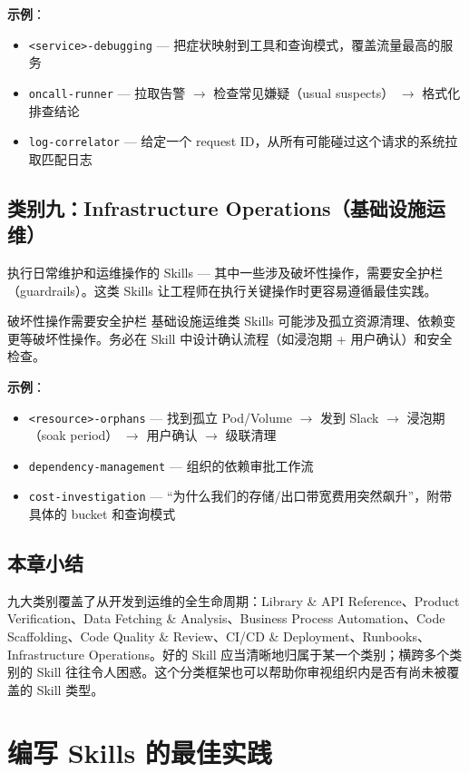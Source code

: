 \documentclass[a4paper]{article}
\begin{document}
\textbf{示例}：
\begin{itemize}
    \item \texttt{<service>-debugging} --- 把症状映射到工具和查询模式，覆盖流量最高的服务
    \item \texttt{oncall-runner} --- 拉取告警 $\to$ 检查常见嫌疑（usual suspects） $\to$ 格式化排查结论
    \item \texttt{log-correlator} --- 给定一个 request ID，从所有可能碰过这个请求的系统拉取匹配日志
\end{itemize}

\subsection{类别九：Infrastructure Operations（基础设施运维）}

执行日常维护和运维操作的 Skills --- 其中一些涉及破坏性操作，需要安全护栏（guardrails）。这类 Skills 让工程师在执行关键操作时更容易遵循最佳实践。

\begin{warningbox}{破坏性操作需要安全护栏}
基础设施运维类 Skills 可能涉及孤立资源清理、依赖变更等破坏性操作。务必在 Skill 中设计确认流程（如浸泡期 + 用户确认）和安全检查。
\end{warningbox}

\textbf{示例}：
\begin{itemize}
    \item \texttt{<resource>-orphans} --- 找到孤立 Pod/Volume $\to$ 发到 Slack $\to$ 浸泡期（soak period） $\to$ 用户确认 $\to$ 级联清理
    \item \texttt{dependency-management} --- 组织的依赖审批工作流
    \item \texttt{cost-investigation} --- ``为什么我们的存储/出口带宽费用突然飙升''，附带具体的 bucket 和查询模式
\end{itemize}

\subsection{本章小结}

九大类别覆盖了从开发到运维的全生命周期：Library \& API Reference、Product Verification、Data Fetching \& Analysis、Business Process Automation、Code Scaffolding、Code Quality \& Review、CI/CD \& Deployment、Runbooks、Infrastructure Operations。好的 Skill 应当清晰地归属于某一个类别；横跨多个类别的 Skill 往往令人困惑。这个分类框架也可以帮助你审视组织内是否有尚未被覆盖的 Skill 类型。

\section{编写 Skills 的最佳实践}
\end{document}
